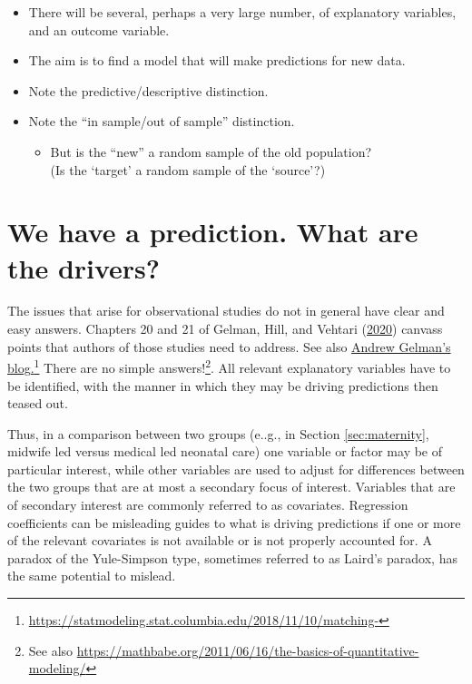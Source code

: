 \documentclass[
  10pt,
  b5paper]{book}
\providecommand{\tightlist}{%
  \setlength{\itemsep}{0pt}\setlength{\parskip}{0pt}}
\begin{document}
\begin{itemize}
\tightlist
\item
  There will be several, perhaps a very large number,
  of explanatory variables, and an outcome variable.
\item
  The aim is to find a model that will make predictions for new data.
\item
  Note the predictive/descriptive distinction.\\
\item
  Note the ``in sample/out of sample'' distinction.

  \begin{itemize}
  \tightlist
  \item
    But is the ``new'' a random sample of the old population?\\
    (Is the `target' a random sample of the `source'?)
  \end{itemize}
\end{itemize}

\hypertarget{we-have-a-prediction.-what-are-the-drivers}{%
\section{We have a prediction. What are the drivers?}\label{we-have-a-prediction.-what-are-the-drivers}}

The issues that arise for observational studies do not in general have
clear and easy answers. Chapters 20 and 21 of Gelman, Hill, and Vehtari (\protect\hyperlink{ref-gelman2020regression}{2020})
canvass points that authors of those studies need to address. See also
\href{https://statmodeling.stat.columbia.edu/2018/11/10/matching-discarding-non-matches-deal-lack-complete-overlap-regression-adjust-imbalance-treatment-control-groups/}{Andrew Gelman's blog.}\footnote{\url{https://statmodeling.stat.columbia.edu/2018/11/10/matching-}} There are no simple
answers!\footnote{See also \url{https://mathbabe.org/2011/06/16/the-basics-of-quantitative-modeling/}}. All relevant explanatory variables have to be identified,
with the manner in which they may be driving predictions then
teased out.

Thus, in a comparison between two groups (e..g., in Section
\ref{sec:maternity}, midwife led versus medical led neonatal
care) one variable or factor may be of particular interest, while
other variables are used to adjust for differences between the
two groups that are at most a secondary focus of interest.
Variables that are of secondary interest are commonly referred to
as covariates. Regression coefficients can be misleading guides
to what is driving predictions if one or more of the relevant
covariates is not available or is not properly accounted for. A
paradox of the Yule-Simpson type, sometimes referred to as
Laird's paradox, has the same potential to mislead.
\end{document}
